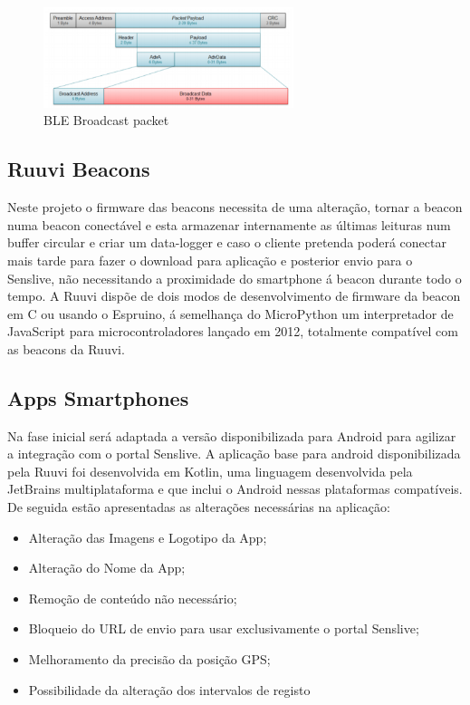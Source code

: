 \begin{figure}[htb]
\centering
\includegraphics[width=0.65\textwidth]{images/blepacket.png}
\caption{BLE Broadcast packet\cite{blepacket}}\label{blepacket}
\end{figure}


\subsection{Ruuvi Beacons}
\par Neste projeto o firmware das beacons necessita de uma alteração, tornar a beacon numa beacon conectável e esta armazenar internamente as últimas leituras num buffer circular e criar um data-logger e caso o cliente pretenda poderá conectar mais tarde para fazer o download para aplicação e posterior envio para o Senslive, não necessitando a proximidade do smartphone á beacon durante todo o tempo. A Ruuvi dispõe de dois modos de desenvolvimento de firmware da beacon em C ou usando o Espruino, á semelhança do MicroPython um interpretador de JavaScript para microcontroladores lançado em 2012, totalmente compatível com as beacons da Ruuvi.

\subsection{Apps Smartphones}
Na fase inicial será adaptada a versão disponibilizada para Android para agilizar a integração com o portal Senslive. A aplicação base para android disponibilizada pela Ruuvi foi desenvolvida em Kotlin\cite{ruuviappgithub}, uma linguagem desenvolvida pela JetBrains multiplataforma e que inclui o Android nessas plataformas compatíveis.
De seguida estão apresentadas as alterações necessárias na aplicação:
\begin{itemize}
\item Alteração das Imagens e Logotipo da App;
\item Alteração do Nome da App;
\item Remoção de conteúdo não necessário;
\item Bloqueio do URL de envio para usar exclusivamente o portal Senslive;
\item Melhoramento da precisão da posição GPS;
\item Possibilidade da alteração dos intervalos de registo
\end{itemize}


